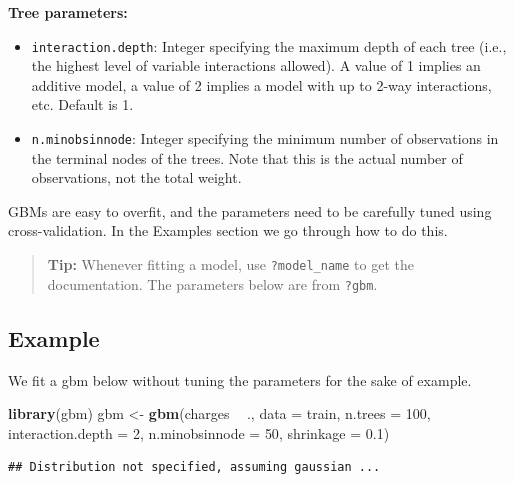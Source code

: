 \documentclass[openany]{book}
\newenvironment{Shaded}{\begin{snugshade}}{\end{snugshade}}
\newcommand{\DataTypeTok}[1]{\textcolor[rgb]{0.13,0.29,0.53}{#1}}
\newcommand{\DecValTok}[1]{\textcolor[rgb]{0.00,0.00,0.81}{#1}}
\newcommand{\FloatTok}[1]{\textcolor[rgb]{0.00,0.00,0.81}{#1}}
\newcommand{\KeywordTok}[1]{\textcolor[rgb]{0.13,0.29,0.53}{\textbf{#1}}}
\newcommand{\NormalTok}[1]{#1}
\newcommand{\OperatorTok}[1]{\textcolor[rgb]{0.81,0.36,0.00}{\textbf{#1}}}
\newcommand{\StringTok}[1]{\textcolor[rgb]{0.31,0.60,0.02}{#1}}
\begin{document}
\textbf{Tree parameters:}

\begin{itemize}
\item
  \texttt{interaction.depth}: Integer specifying the maximum depth of each tree (i.e., the highest level of variable interactions allowed). A value of 1 implies an additive model, a value of 2 implies a model with up to 2-way interactions, etc. Default is 1.
\item
  \texttt{n.minobsinnode}: Integer specifying the minimum number of observations in the terminal nodes of the trees. Note that this is the actual number of observations, not the total weight.
\end{itemize}

GBMs are easy to overfit, and the parameters need to be carefully tuned using cross-validation. In the Examples section we go through how to do this.

\begin{quote}
\textbf{Tip:} Whenever fitting a model, use \texttt{?model\_name} to get the documentation. The parameters below are from \texttt{?gbm}.
\end{quote}

\hypertarget{example-4}{%
\subsection{Example}\label{example-4}}

We fit a gbm below without tuning the parameters for the sake of example.

\begin{Shaded}
\begin{Highlighting}[]
\KeywordTok{library}\NormalTok{(gbm)}
\NormalTok{gbm <-}\StringTok{ }\KeywordTok{gbm}\NormalTok{(charges }\OperatorTok{~}\StringTok{ }\NormalTok{., }\DataTypeTok{data =}\NormalTok{ train,}
           \DataTypeTok{n.trees =} \DecValTok{100}\NormalTok{,}
           \DataTypeTok{interaction.depth =} \DecValTok{2}\NormalTok{,}
           \DataTypeTok{n.minobsinnode =} \DecValTok{50}\NormalTok{,}
           \DataTypeTok{shrinkage =} \FloatTok{0.1}\NormalTok{)}
\end{Highlighting}
\end{Shaded}

\begin{verbatim}
## Distribution not specified, assuming gaussian ...
\end{verbatim}

\begin{Shaded}
\end{Shaded}
\end{document}

